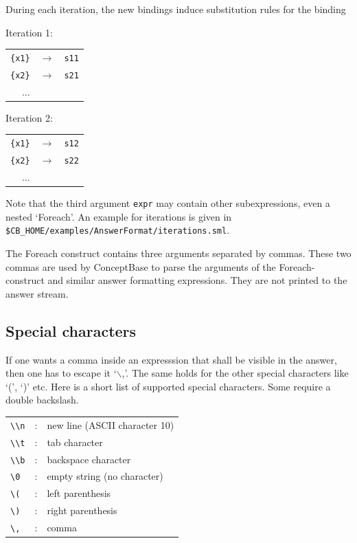 During each iteration, the new bindings induce substitution rules for the binding

Iteration 1: \\
\begin{tabular}{rcl}
   \verb+{x1}+ & $ \longrightarrow $ & {\tt s11} \\
   \verb+{x2}+ & $ \longrightarrow $ & {\tt s21} \\
   ... \\
\end{tabular}

Iteration 2: \\
\begin{tabular}{rcl}
   \verb+{x1}+ & $ \longrightarrow $ & {\tt s12}\\
   \verb+{x2}+ & $ \longrightarrow $ & {\tt s22}\\
   ... \\
\end{tabular}

Note that the third argument {\tt expr} may contain other subexpressions, even a nested `Foreach'.
An example for iterations is given in
\verb+$CB_HOME/examples/AnswerFormat/iterations.sml+.

The Foreach construct contains three arguments separated by commas. 
These two commas are used by ConceptBase to parse the arguments
of the Foreach-construct and similar answer formatting expressions.
They are not printed to the answer stream.

\subsection{Special characters}

If one wants a comma inside an expresssion that shall be
visible in the answer, then one has to escape it `$\backslash$,'.
The same holds for the other special characters like `(', `)' etc.
Here is a short list of supported special characters. Some require
a double backslash. \newline

\begin{tabular}{lcl}
   {\tt \textbackslash\textbackslash n} & : & new line (ASCII character 10)\\
   {\tt \textbackslash\textbackslash t} & : & tab character\\
   {\tt \textbackslash\textbackslash b} & : & backspace character\\
   {\tt \textbackslash 0} & :  & empty string (no character)\\
   {\tt \textbackslash (} & :  & left parenthesis\\
   {\tt \textbackslash )} & :  & right parenthesis\\
   {\tt \textbackslash ,} & :  & comma\\
\end{tabular}

